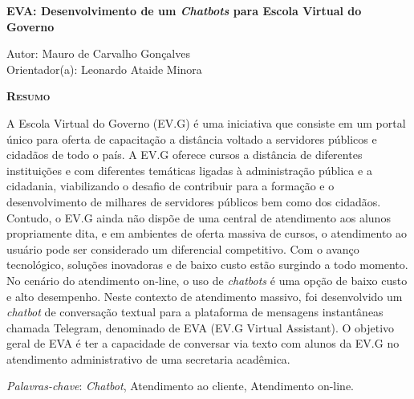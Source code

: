 \begin{center}
	{\Large{\textbf{EVA: Desenvolvimento de um \textit{Chatbots} para Escola Virtual do Governo}}}
\end{center}

\vspace{1cm}

\begin{flushright}
	Autor: Mauro de Carvalho Gonçalves\\
	Orientador(a): Leonardo Ataide Minora
\end{flushright}

\vspace{1cm}

\begin{center}
	\Large{\textsc{\textbf{Resumo}}}
\end{center}

\noindent A Escola Virtual do Governo (EV.G) é uma iniciativa que consiste em um portal único para oferta de capacitação a distância voltado a servidores públicos e cidadãos de todo o país.
A EV.G oferece cursos a distância de diferentes instituições e com diferentes temáticas ligadas à administração pública e a cidadania, viabilizando o desafio de contribuir para a formação e o desenvolvimento de milhares de servidores públicos bem como dos cidadãos.
Contudo, o EV.G ainda não dispõe de uma central de atendimento aos alunos propriamente dita, e em ambientes de oferta massiva de cursos, o atendimento ao usuário pode ser considerado um diferencial competitivo.
Com o avanço tecnológico, soluções inovadoras e de baixo custo estão surgindo a todo momento. No cenário do atendimento on-line, o uso de \textit{chatbots} é uma opção de baixo custo e alto desempenho. 
Neste contexto de atendimento massivo, foi desenvolvido um \textit{chatbot} de conversação textual para a plataforma de mensagens instantâneas chamada Telegram, denominado de EVA (EV.G Virtual Assistant). O objetivo geral de EVA é ter a capacidade de conversar via texto com alunos da EV.G no atendimento administrativo de uma secretaria acadêmica.


\noindent\textit{Palavras-chave}: \textit{Chatbot}, Atendimento ao cliente, Atendimento on-line.
